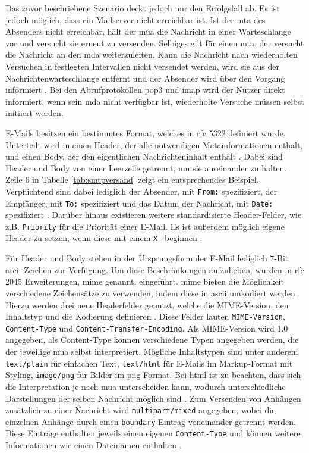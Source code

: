 Das zuvor beschriebene Szenario deckt jedoch nur den Erfolgsfall ab. Es ist jedoch möglich, dass ein Mailserver nicht erreichbar ist. Ist der \acrshort{mta} des Absenders nicht erreichbar, hält der \acrshort{mua} die Nachricht in einer Warteschlange vor und versucht sie erneut zu versenden. Selbiges gilt für einen \acrshort{mta}, der versucht die Nachricht an den \acrshort{mda} weiterzuleiten. Kann die Nachricht nach wiederholten Versuchen in festlegten Intervallen nicht versendet werden, wird sie aus der Nachrichtenwarteschlange entfernt und der Absender wird über den Vorgang informiert \citep[S. 144 f.]{Kurose2014}. Bei den Abrufprotokollen \acrshort{pop3} und \acrshort{imap} wird der Nutzer direkt informiert, wenn sein \acrshort{mda} nicht verfügbar ist, wiederholte Versuche müssen selbst initiiert werden.

E-Mails besitzen ein bestimmtes Format, welches in \acrshort{rfc} 5322 definiert wurde. Unterteilt wird in einen Header, der alle notwendigen Metainformationen enthält, und einen Body, der den eigentlichen Nachrichteninhalt enthält \citep[S. 6 ff.]{RFC5322}. Dabei sind Header und Body von einer Leerzeile getrennt, um sie auseinander zu halten. Zeile 6 in Tabelle \ref{tab:smtpversand} zeigt ein entsprechendes Beispiel. Verpflichtend sind dabei lediglich der Absender, mit \texttt{From:} spezifiziert, der Empfänger, mit \texttt{To:} spezifiziert und das Datum der Nachricht, mit \texttt{Date:} spezifiziert \citep[S. 18]{RFC5322}. Darüber hinaus existieren weitere standardisierte Header-Felder, wie z.B. \texttt{Priority} für die Priorität einer E-Mail.  Es ist außerdem möglich eigene Header zu setzen, wenn diese mit einem \texttt{X-} beginnen \citep[S. 24]{RFC822}. 

Für Header und Body stehen in der Ursprungsform der E-Mail lediglich 7-Bit \acrshort{ascii}-Zeichen zur Verfügung. Um diese Beschränkungen aufzuheben, wurden in \acrshort{rfc} 2045 Erweiterungen, \acrfull{mime} genannt, eingeführt. \acrshort{mime} bieten die Möglichkeit verschiedene Zeichensätze zu verwenden, indem diese in \acrshort{ascii} umkodiert werden \citep[S. 3 f.]{RFC2045}. Hierzu werden drei neue Headerfelder genutzt, welche die MIME-Version, den Inhaltstyp und die Kodierung definieren \citep[S. 9 f.]{RFC2045}. Diese Felder lauten \texttt{MIME-Version}, \texttt{Content-Type} und \texttt{Content-Transfer-Encoding}. Als MIME-Version wird 1.0 angegeben, als Content-Type können verschiedene Typen angegeben werden, die der jeweilige \acrshort{mua} selbst interpretiert. Mögliche Inhaltstypen sind unter anderem \texttt{text/plain} für einfachen Text, \texttt{text/html} für E-Mails im Markup-Format mit Styling, \texttt{image/png} für Bilder im \acrshort{png}-Format. Bei \acrshort{html} ist zu beachten, dass sich die Interpretation je nach \acrshort{mua} unterscheiden kann, wodurch unterschiedliche Darstellungen der selben Nachricht möglich sind \citep[S. 6 f.]{RFC2046}. Zum Versenden von Anhängen zusätzlich zu einer Nachricht wird \texttt{multipart/mixed} angegeben, wobei die einzelnen Anhänge durch einen \texttt{boundary}-Eintrag voneinander getrennt werden. Diese Einträge enthalten jeweils einen eigenen \texttt{Content-Type} und können weitere Informationen wie einen Dateinamen enthalten \citep[S. 268 f.]{Zisler2014}. 

